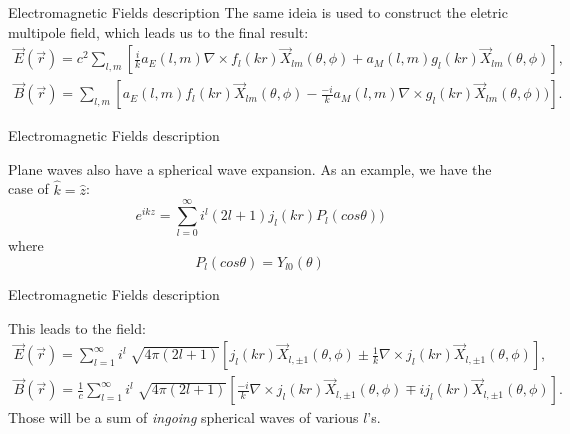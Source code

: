 \documentclass[10pt]{beamer}
\begin{document}

\begin{frame}[fragile]{Electromagnetic Fields description}
The same ideia is used to construct the eletric multipole field, which leads us to the final result:
      \begin{equation*}
      \begin{split}
          \vec{E}(\vec{r})=c^2\sum_{l,m}\left[ \frac{i}{k}a_E(l,m)\nabla \times f_l(kr)\vec{X}_{lm}(\theta,\phi) + a_M(l,m)g_l(kr)\vec{X}_{lm}(\theta,\phi)  \right],\\
          \vec{B}(\vec{r})=\sum_{l,m}\left[ a_E(l,m)f_l(kr)\vec{X}_{lm}(\theta,\phi) - \frac{-i}{k} a_M(l,m)\nabla \times g_l(kr)\vec{X}_{lm}(\theta,\phi)) \right].
      \end{split}
      \end{equation*}

\end{frame}


\begin{frame}[fragile]{Electromagnetic Fields description}

Plane waves also have a spherical wave expansion. As an example, we have the case of $\hat{k}=\hat{z}$:
      \begin{equation*}
          e^{ikz}= \sum_{l=0}^{\infty}i^l(2l+1)j_l(kr)P_l(cos\theta))
      \end{equation*}
      where
      \begin{equation*}
          P_l(cos\theta)=Y_{l0}(\theta)
      \end{equation*}


\end{frame}


\begin{frame}[fragile]{Electromagnetic Fields description}

This leads to the field:
      \begin{equation*}
      \begin{split}
          \vec{E}(\vec{r})=\sum_{l=1}^{\infty}i^l\sqrt[]{4\pi(2l+1)}\left[j_l(kr)\vec{X}_{l,\pm1}(\theta,\phi) \pm \frac{1}{k}\nabla \times j_l(kr)\vec{X}_{l,\pm1}(\theta,\phi)  \right],\\
          \vec{B}(\vec{r})=\frac{1}{c}\sum_{l=1}^{\infty}i^l\sqrt[]{4\pi(2l+1)}\left[ \frac{-i}{k}\nabla \times j_l(kr)\vec{X}_{l,\pm1}(\theta,\phi) \mp  ij_l(kr)\vec{X}_{l,\pm1}(\theta,\phi)\right].
      \end{split}
      \end{equation*}
Those will be a sum of \emph{ingoing} spherical waves of various $l$'s.
\end{frame}
\end{document}
